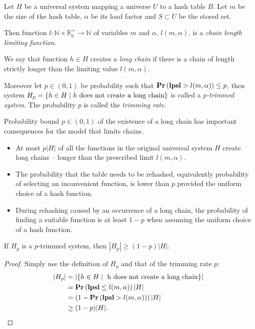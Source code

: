 \begin{definition}
Let $H$ be a universal system mapping a universe $U$ to a hash table $B$. Let $m$ be the size of the hash table, $\alpha$ be its load factor and $S \subset U$ be the stored set. 

Then function $l: \mathbb{N} \times \mathbb{R}_{0}^{+} \rightarrow \mathbb{N}$ of variables $m$ and $\alpha$, $l(m, \alpha)$, is a \emph{chain length limiting function}. 

We say that function $h \in H$ creates a \emph{long chain} if there is a chain of length strictly longer than the limiting value $l(m, \alpha)$.

Moreover let $p \in (0, 1)$ be probability such that $\mathbf{Pr}\left(\mathbf{lpsl} > l(m, \alpha)\right) \leq p$, then system $H_p = \{ h \in H \mid h \text{ does not create a long chain} \}$ is called a \emph{$p$-trimmed system}. The probability $p$ is called the \emph{trimming rate}.
\end{definition}

Probability bound $p \in (0, 1)$ of the existence of a long chain has important consequences for the model that limits chains.
\begin{itemize}
\item At most $p|H|$ of all the functions in the original universal system $H$ create long chains -- longer than the prescribed limit $l(m, \alpha)$. 
\item The probability that the table needs to be rehashed, equivalently probability of selecting an inconvenient function, is lower than $p$ provided the uniform choice of a hash function.
\item During rehashing caused by an occurrence of a long chain, the probability of finding a suitable function is at least $1 - p$ when assuming the uniform choice of a hash function.
\end{itemize}

\begin{lemma}
\label{lemma-size-of-trimmed-system}
If $H_p$ is a $p$-trimmed system, then $|H_p| \geq (1 - p)|H|$.
\end{lemma}
\begin{proof}
Simply use the definition of $H_p$ and that of the trimming rate $p$:
\[
\begin{split}
|H_p|
	& = |\lbrace h \in H \mid \text{ h does not create a long chain} \rbrace| \\
	& =\mathbf{Pr}\left(\mathbf{lpsl} \leq l(m, \alpha)\right) |H| \\
	& = \left(1 - \mathbf{Pr}\left(\mathbf{lpsl} > l(m, \alpha)\right)\right) |H| \\
	& \geq (1 - p)|H| \text{.}
\end{split}
\]
\end{proof}

